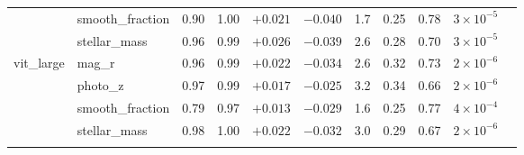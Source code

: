 \begin{tabular}{llccccccccc}
 & smooth\_fraction & 0.90 & 1.00 & $+0.021$ & $-0.040$ & 1.7 & 0.25 & 0.78 & $3\times 10^{-5}$ \\
 & stellar\_mass & 0.96 & 0.99 & $+0.026$ & $-0.039$ & 2.6 & 0.28 & 0.70 & $3\times 10^{-5}$ \\
\addlinespace[2pt]
vit\_large & mag\_r & 0.96 & 0.99 & $+0.022$ & $-0.034$ & 2.6 & 0.32 & 0.73 & $2\times 10^{-6}$ \\
 & photo\_z & 0.97 & 0.99 & $+0.017$ & $-0.025$ & 3.2 & 0.34 & 0.66 & $2\times 10^{-6}$ \\
 & smooth\_fraction & 0.79 & 0.97 & $+0.013$ & $-0.029$ & 1.6 & 0.25 & 0.77 & $4\times 10^{-4}$ \\
 & stellar\_mass & 0.98 & 1.00 & $+0.022$ & $-0.032$ & 3.0 & 0.29 & 0.67 & $2\times 10^{-6}$ \\
\addlinespace[2pt]
\bottomrule
\end{tabular}
